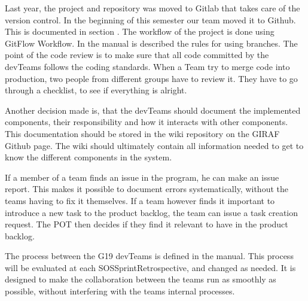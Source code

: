 Last year, the project and repository was moved to Gitlab that takes care of the version control. In the beginning of this semester our team moved it to Github. This is documented in section . The workflow of the project is done using GitFlow Workflow. In the manual is described the rules for using branches. 
The point of the code review is to make sure that all code committed by the \glspl{devTeam} follows the coding standards. When a Team try to merge code into production, two people from different groups have to review it. They have to go through a checklist, to see if everything is alright. 

Another decision made is, that the \glspl{devTeam} should document the implemented components, their responsibility and how it interacts with other components. This documentation should be stored in the wiki repository on the GIRAF Github page. The wiki should ultimately contain all information needed to get to know the different components in the system.  

If a member of a team finds an issue in the program, he can make an issue report. This makes it possible to document errors systematically, without the \glspl{team} having to fix it themselves. If a \gls{team} however finds it important to introduce a new task to the product backlog, the team can issue a task creation request. The \gls{POT} then decides if they find it relevant to have in the product backlog. 

The process between the \gls{G19} \glspl{devTeam} is defined in the manual. This process will be evaluated at each \gls{SOSSprintRetrospective}, and changed as needed. It is designed to make the collaboration between the \glspl{team} run as smoothly as possible, without interfering with the \glspl{team} internal processes.  
